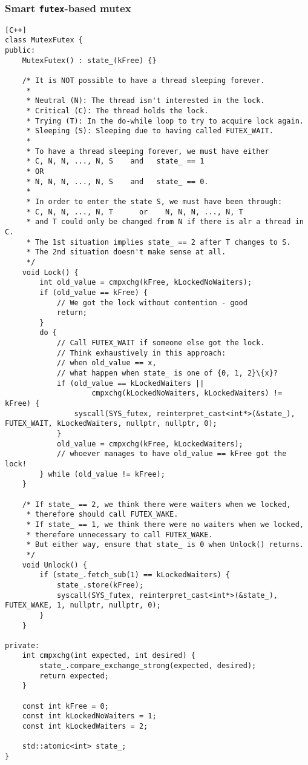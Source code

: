 \documentclass[twocolumn,landscape,10pt]{article}
\theoremstyle{definition}
\begin{document}
\subsubsection{Smart \texttt{futex}-based mutex}

\begin{lstlisting}[C++]
class MutexFutex {
public:
    MutexFutex() : state_(kFree) {}

    /* It is NOT possible to have a thread sleeping forever.
     *
     * Neutral (N): The thread isn't interested in the lock.
     * Critical (C): The thread holds the lock.
     * Trying (T): In the do-while loop to try to acquire lock again.
     * Sleeping (S): Sleeping due to having called FUTEX_WAIT.
     * 
     * To have a thread sleeping forever, we must have either
     * C, N, N, ..., N, S    and   state_ == 1
     * OR
     * N, N, N, ..., N, S    and   state_ == 0.
     *
     * In order to enter the state S, we must have been through:
     * C, N, N, ..., N, T      or    N, N, N, ..., N, T
     * and T could only be changed from N if there is alr a thread in C.
     * The 1st situation implies state_ == 2 after T changes to S.
     * The 2nd situation doesn't make sense at all.
     */
    void Lock() {
        int old_value = cmpxchg(kFree, kLockedNoWaiters);
        if (old_value == kFree) {
            // We got the lock without contention - good
            return;
        }
        do {
            // Call FUTEX_WAIT if someone else got the lock.
            // Think exhaustively in this approach:
            // when old_value == x,
            // what happen when state_ is one of {0, 1, 2}\{x}?
            if (old_value == kLockedWaiters ||
                    cmpxchg(kLockedNoWaiters, kLockedWaiters) != kFree) {
                syscall(SYS_futex, reinterpret_cast<int*>(&state_), FUTEX_WAIT, kLockedWaiters, nullptr, nullptr, 0);
            }
            old_value = cmpxchg(kFree, kLockedWaiters);
            // whoever manages to have old_value == kFree got the lock!
        } while (old_value != kFree);
    }

    /* If state_ == 2, we think there were waiters when we locked,
     * therefore should call FUTEX_WAKE.
     * If state_ == 1, we think there were no waiters when we locked,
     * therefore unnecessary to call FUTEX_WAKE.
     * But either way, ensure that state_ is 0 when Unlock() returns.
     */
    void Unlock() {
        if (state_.fetch_sub(1) == kLockedWaiters) {
            state_.store(kFree);
            syscall(SYS_futex, reinterpret_cast<int*>(&state_), FUTEX_WAKE, 1, nullptr, nullptr, 0);
        }
    }

private:
    int cmpxchg(int expected, int desired) {
        state_.compare_exchange_strong(expected, desired);
        return expected;
    }

    const int kFree = 0;
    const int kLockedNoWaiters = 1;
    const int kLockedWaiters = 2;

    std::atomic<int> state_;
}
\end{lstlisting} 
\end{document}
